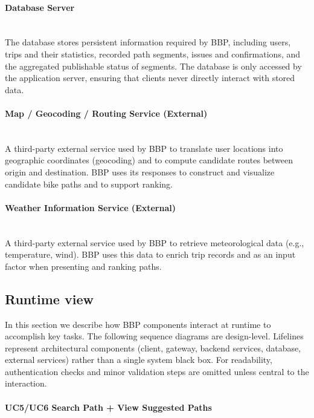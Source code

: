 \paragraph{Database Server} \mbox{}\\
The database stores persistent information required by BBP, including users, trips and their
statistics, recorded path segments, issues and confirmations, and the aggregated publishable
status of segments. The database is only accessed by the application server, ensuring that
clients never directly interact with stored data.

\paragraph{Map / Geocoding / Routing Service (External)} \mbox{}\\
A third-party external service used by BBP to translate user locations into geographic
coordinates (geocoding) and to compute candidate routes between origin and destination.
BBP uses its responses to construct and visualize candidate bike paths and to support
ranking.

\paragraph{Weather Information Service (External)} \mbox{}\\
A third-party external service used by BBP to retrieve meteorological data (e.g., temperature,
wind). BBP uses this data to enrich trip records and as an input factor when presenting and
ranking paths.

\subsection{Runtime view}

In this section we describe how BBP components interact at runtime to accomplish key tasks.
The following sequence diagrams are design-level. Lifelines represent architectural
components (client, gateway, backend services, database, external services) rather than a
single system black box. For readability, authentication checks and minor validation steps
are omitted unless central to the interaction.

\paragraph{UC5/UC6 Search Path + View Suggested Paths} \mbox{}\\

